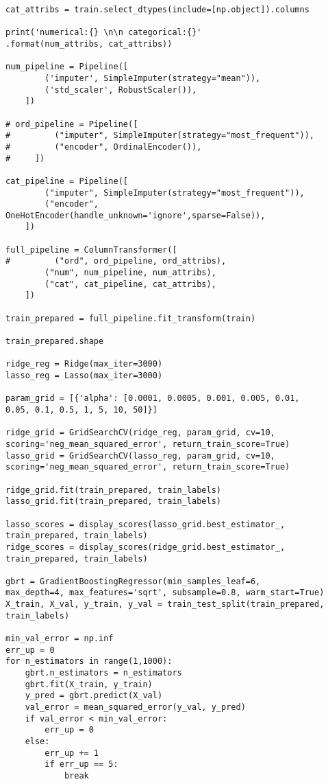 \documentclass[12pt]{article}%
\begin{document}
\begin{lstlisting}
cat_attribs = train.select_dtypes(include=[np.object]).columns

print('numerical:{} \n\n categorical:{}'
.format(num_attribs, cat_attribs))

num_pipeline = Pipeline([
        ('imputer', SimpleImputer(strategy="mean")),
        ('std_scaler', RobustScaler()),
    ])

# ord_pipeline = Pipeline([
#         ("imputer", SimpleImputer(strategy="most_frequent")),
#         ("encoder", OrdinalEncoder()),
#     ])

cat_pipeline = Pipeline([
        ("imputer", SimpleImputer(strategy="most_frequent")),
        ("encoder", OneHotEncoder(handle_unknown='ignore',sparse=False)),
    ])

full_pipeline = ColumnTransformer([
#         ("ord", ord_pipeline, ord_attribs),
        ("num", num_pipeline, num_attribs),
        ("cat", cat_pipeline, cat_attribs),
    ])

train_prepared = full_pipeline.fit_transform(train)

train_prepared.shape

ridge_reg = Ridge(max_iter=3000)
lasso_reg = Lasso(max_iter=3000)

param_grid = [{'alpha': [0.0001, 0.0005, 0.001, 0.005, 0.01,
0.05, 0.1, 0.5, 1, 5, 10, 50]}]

ridge_grid = GridSearchCV(ridge_reg, param_grid, cv=10,
scoring='neg_mean_squared_error', return_train_score=True)
lasso_grid = GridSearchCV(lasso_reg, param_grid, cv=10,
scoring='neg_mean_squared_error', return_train_score=True)

ridge_grid.fit(train_prepared, train_labels)
lasso_grid.fit(train_prepared, train_labels)

lasso_scores = display_scores(lasso_grid.best_estimator_,
train_prepared, train_labels)
ridge_scores = display_scores(ridge_grid.best_estimator_,
train_prepared, train_labels)

gbrt = GradientBoostingRegressor(min_samples_leaf=6, 
max_depth=4, max_features='sqrt', subsample=0.8, warm_start=True)
X_train, X_val, y_train, y_val = train_test_split(train_prepared, 
train_labels)

min_val_error = np.inf
err_up = 0
for n_estimators in range(1,1000):
    gbrt.n_estimators = n_estimators
    gbrt.fit(X_train, y_train)
    y_pred = gbrt.predict(X_val)
    val_error = mean_squared_error(y_val, y_pred)
    if val_error < min_val_error:
        err_up = 0
    else:
        err_up += 1
        if err_up == 5:
            break


\end{lstlisting}
\end{document}
